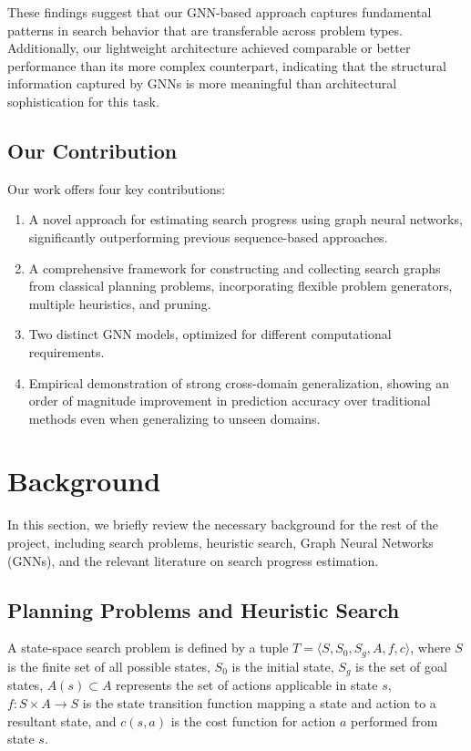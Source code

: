 \documentclass[letterpaper]{article}
\begin{document}
These findings suggest that our GNN-based approach captures fundamental patterns in search behavior that are transferable across problem types. Additionally, our lightweight architecture achieved comparable or better performance than its more complex counterpart, indicating that the structural information captured by GNNs is more meaningful than architectural sophistication for this task.

\subsection{Our Contribution}

Our work offers four key contributions:
\begin{enumerate}
    \item A novel approach for estimating search progress using graph neural networks, significantly outperforming previous sequence-based approaches.
    \item A comprehensive framework for constructing and collecting search graphs from classical planning problems, incorporating flexible problem generators, multiple heuristics, and pruning.
    \item Two distinct GNN models, optimized for different computational requirements.
    \item Empirical demonstration of strong cross-domain generalization, showing an order of magnitude improvement in prediction accuracy over traditional methods even when generalizing to unseen domains.
\end{enumerate}

\section{Background}

In this section, we briefly review the necessary background for the rest of the project, including search problems, heuristic search, Graph Neural Networks (GNNs), and the relevant literature on search progress estimation.

\subsection{Planning Problems and Heuristic Search}

A state-space search problem is defined by a tuple $T = \langle S, S_0, S_g, A, f, c\rangle$, where $S$ is the finite set of all possible states, $S_0$ is the initial state, $S_g$ is the set of goal states, $A(s) \subset A$ represents the set of actions applicable in state $s$, $f: S \times A \rightarrow S$ is the state transition function mapping a state and action to a resultant state, and $c(s,a)$ is the cost function for action $a$ performed from state $s$.
\end{document}
